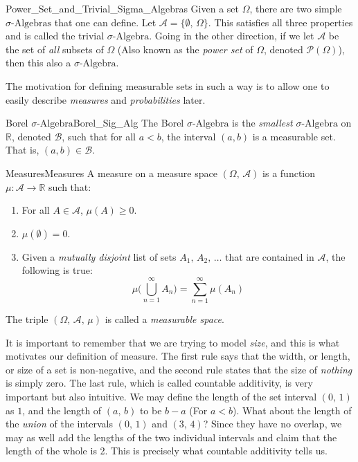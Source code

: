     \begin{lexample}{}{Power_Set_and_Trivial_Sigma_Algebras}
        Given a set $\Omega$, there are two simple
        $\sigma\textrm{-Algebras}$ that one can define. Let
        $\mathcal{A}=\{\emptyset,\,\Omega\}$. This satisfies all three
        properties and is called the trivial $\sigma\textrm{-Algebra}$.
        Going in the other direction, if we let $\mathcal{A}$ be the set of
        \textit{all} subsets of $\Omega$ (Also known as the
        \textit{power set} of $\Omega$, denoted $\mathcal{P}(\Omega)$),
        then this also a $\sigma\textrm{-Algebra}$.
    \end{lexample}
    The motivation for defining measurable sets in such a way is to allow
    one to easily describe \textit{measures} and \textit{probabilities}
    later.
    \begin{ldefinition}{Borel $\sigma\textrm{-Algebra}$}{Borel_Sig_Alg}
        The Borel $\sigma\textrm{-Algebra}$ is the \textit{smallest}
        $\sigma\textrm{-Algebra}$ on $\mathbb{R}$, denoted $\mathcal{B}$,
        such that for all $a<b$, the interval $(a,b)$ is a measurable
        set. That is, $(a,b)\in\mathcal{B}$.
    \end{ldefinition}
    \begin{ldefinition}{Measures}{Measures}
        A measure on a measure space $(\Omega,\,\mathcal{A})$ is a
        function $\mu:\mathcal{A}\rightarrow\mathbb{R}$ such that:
        \begin{enumerate}
            \item For all $A\in\mathcal{A}$, $\mu(A)\geq{0}$.
            \item $\mu(\emptyset)=0$.
            \item Given a \textit{mutually disjoint} list of sets
                  $A_{1},\,A_{2},\,\dots$ that are contained in
                  $\mathcal{A}$, the following is true:
                  \begin{equation}
                      \mu\Big(\bigcup_{n=1}^{\infty}A_{n}\Big)=
                      \sum_{n=1}^{\infty}\mu(A_{n})
                  \end{equation}
        \end{enumerate}
        The triple $(\Omega,\,\mathcal{A},\,\mu)$ is called a
        \textit{measurable space}.
    \end{ldefinition}
    It is important to remember that we are trying to model \textit{size},
    and this is what motivates our definition of measure. The first rule
    says that the width, or length, or size of a set is non-negative,
    and the second rule states that the size of \textit{nothing} is simply
    zero. The last rule, which is called countable additivity, is
    very important but also intuitive. We may define the length of
    the set interval $(0,\,1)$ as $1$, and the length of
    $(a,\,b)$ to be $b-a$ (For $a<b$). What about the length of the
    \textit{union} of the intervals $(0,\,1)$ and $(3,\,4)$? Since they
    have no overlap, we may as well add the lengths of the two
    individual intervals and claim that the length of the whole is 2.
    This is precisely what countable additivity tells us.
